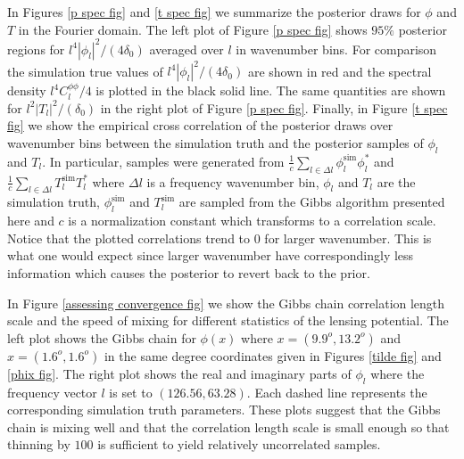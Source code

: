 \documentclass[iop,revtex4,apj,onecolumn]{emulateapj}
\begin{document}
In Figures \ref{p spec fig} and \ref{t spec fig} we summarize the posterior draws for $\phi$ and $T$ in the Fourier domain. The left plot of Figure \ref{p spec fig} shows $95\%$ posterior regions for  $l^4|\phi_l|^2/(4\delta_0)$  averaged over $l$ in wavenumber bins. For comparison the simulation true values of  $l^4|\phi_l|^2/(4\delta_0)$ are shown in red and the spectral density $l^4 C^{\phi\phi}_l/4$ is plotted in the black solid line. 
The same quantities are shown for $l^2|T_l|^2/(\delta_0)$ in the right plot of Figure \ref{p spec fig}. Finally, in Figure \ref{t spec fig} we show the empirical cross correlation of the posterior draws over wavenumber bins between the simulation truth and the posterior samples of $\phi_l$ and $T_l$. In particular,
samples were generated from $\frac{1}{c}\sum_{l\in \Delta l} \phi^\text{sim}_l\phi^*_l $ and $\frac{1}{c}\sum_{l\in \Delta l} T^\text{sim}_lT^*_l $ where $\Delta l$ is a frequency wavenumber bin,  $\phi_l$ and $T_l$ are the simulation truth, $\phi^\text{sim}_l$  and $T^\text{sim}_l$  are sampled from the Gibbs algorithm presented here and $c$ is a normalization constant which transforms to a correlation scale.  Notice that the plotted correlations trend to $0$ for larger wavenumber. This is what one would expect since larger wavenumber have correspondingly less information which causes the posterior to revert back to the prior. 



In Figure \ref{assessing convergence fig}  we show the Gibbs chain correlation length scale  and the speed of mixing for different statistics of the lensing potential. The left plot shows the Gibbs chain for $\phi(x)$ where $x = (9.9^o, 13.2^o)$ and $x = (1.6^o, 1.6^o)$ in the same degree coordinates given in Figures \ref{tilde fig} and \ref{phix fig}. The right plot shows the real and imaginary parts of $\phi_l$ where the frequency vector $l$ is set to  $(126.56,63.28)$. Each dashed line represents the corresponding simulation truth parameters. These plots suggest that the Gibbs chain is mixing well and that the correlation length scale is small enough so that thinning by $100$ is sufficient to yield relatively uncorrelated samples. 
\end{document}
